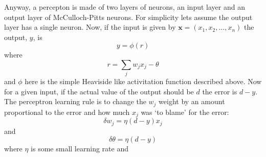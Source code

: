 \documentclass[12pt]{article}
\begin{document}
Anyway, a percepton is made of two layers of neurons, an input layer
and an output layer of McCulloch-Pitts neurons. For simplicity lets
assume the output layer
has a single neuron. Now, if the input is given by
$\textbf{x}=(x_1,x_2,\ldots,x_n)$ the output, $y$, is
\begin{equation}
y=\phi(r)
\end{equation}
where
\begin{equation}
r=\sum_j w_j x_j-\theta
\end{equation}
and $\phi$ here is the simple Heaviside like activitation function
described above. Now for a given input, if the actual value of the
output should be $d$ the error is $d-y$. The perceptron learning rule
is to change the $w_j$ weight by an amount proportional to the error
and how much $x_j$ was \lq{}to blame\rq{} for the error:
\begin{equation}
\delta w_j=\eta (d-y) x_j
\end{equation}
and
\begin{equation}
\delta \theta =  \eta (d-y)
\end{equation}
where $\eta$ is some small learning rate and
\end{document}

